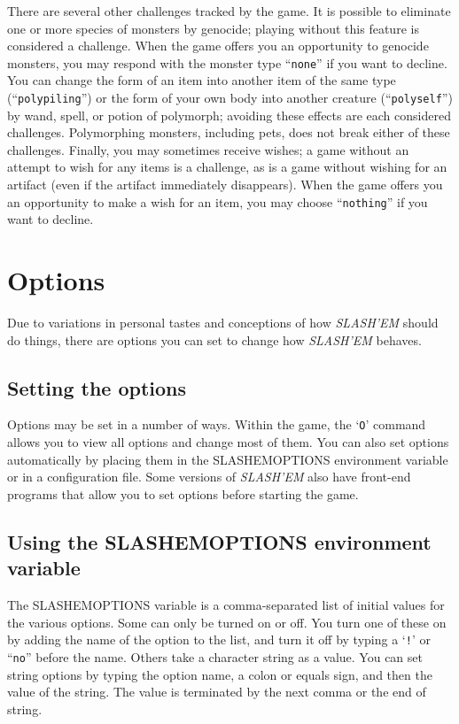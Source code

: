 There are several other challenges tracked by the game.  It is possible
to eliminate one or more species of monsters by genocide; playing without
this feature is considered a challenge.  When the game offers you an
opportunity to genocide monsters, you may respond with the monster type
``{\tt none}'' if you want to decline.  You can change the form of an item into
another item of the same type (``{\tt polypiling}'') or the form of your own
body into another creature (``{\tt polyself}'') by wand, spell, or potion of
polymorph; avoiding these effects are each considered challenges.
Polymorphing monsters, including pets, does not break either of these
challenges.
Finally, you may sometimes receive wishes; a game without an attempt to
wish for any items is a challenge, as is a game without wishing for
an artifact (even if the artifact immediately disappears).  When the
game offers you an opportunity to make a wish for an item, you may
choose ``{\tt nothing}'' if you want to decline.

\section{Options}


Due to variations in personal tastes and conceptions of how {\it SLASH'EM\/}
should do things, there are options you can set to change how {\it SLASH'EM\/}
behaves.
\subsection*{Setting the options}


Options may be set in a number of ways.  Within the game, the `{\tt O}'
command allows you to view all options and change most of them.
You can also set options automatically by placing them in the
SLASHEMOPTIONS environment variable or in a configuration file.
Some versions of {\it SLASH'EM\/} also have front-end programs that allow
you to set options before starting the game.
\subsection*{Using the SLASHEMOPTIONS environment variable}


The SLASHEMOPTIONS variable is a comma-separated list of initial
values for the various options.  Some can only be turned on or off.
You turn one of these on by adding the name of the option to the list,
and turn it off by typing a `{\tt !}' or ``{\tt no}'' before the name.  Others take a 
character string as a value.  You can set string options by typing
the option name, a colon or equals sign, and then the value of the string.
The value is terminated by the next comma or the end of string.

